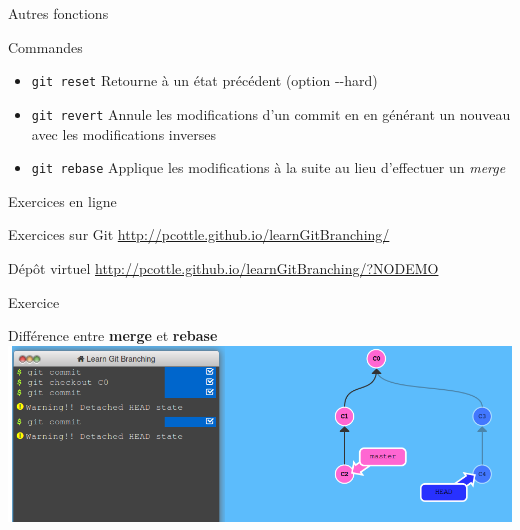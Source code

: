 \documentclass{beamer}
\begin{document}
\begin{frame}[fragile]{Autres fonctions}
  \begin{block}{Commandes}
    \begin{itemize}
    \item \textcolor{commandcolor}{\verb?git reset?}\linebreak
      Retourne à un état précédent (option -{}-hard)
    \item \textcolor{commandcolor}{\verb?git revert?}\linebreak
      Annule les modifications d'un commit en en générant un nouveau avec les modifications inverses
    \item \textcolor{commandcolor}{\verb?git rebase?}\linebreak
      Applique les modifications à la suite au lieu d'effectuer un \textit{merge}
    \end{itemize}
  \end{block}
\end{frame}

\begin{frame}[fragile]{Exercices en ligne}
  \begin{exampleblock}{Exercices sur Git}
    \url{http://pcottle.github.io/learnGitBranching/}
  \end{exampleblock}
  \begin{block}{Dép\^ot virtuel}
    \url{http://pcottle.github.io/learnGitBranching/?NODEMO}
  \end{block}
\end{frame}

\begin{frame}[fragile]{Exercice}
  \begin{exampleblock}{Différence entre \textbf{merge} et \textbf{rebase}}
    \includegraphics[width=\linewidth]{images/virtual-repo}
  \end{exampleblock}
\end{frame}
\end{document}
